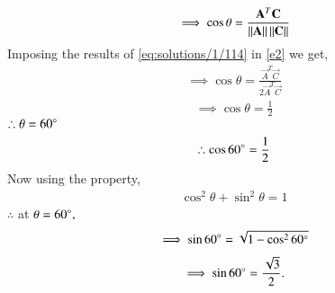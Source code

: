 \begin{align}
\implies \cos\theta = \frac{\mathbf{A}^T\mathbf{C}}{\left\lVert\mathbf{A}\right\rVert\left\lVert\mathbf{C}\right\rVert}
\label{e2}
\end{align}
Imposing the results of \eqref{eq:solutions/1/114} in \eqref{e2} we get,
\begin{align}
\implies \cos\theta = \frac{\vec{A}^T\vec{C}}{2\vec{A}^T\vec{C}}
\end{align}
\begin{align}
\implies \cos\theta = \frac{1}{2}
\end{align}
$\therefore \theta = 60\degree$
\begin{align}
\therefore \cos60\degree = \frac{1}{2}
\end{align}
Now using the property,
\begin{align}
\cos^2\theta +\sin^2\theta = 1
\end{align} 
$\therefore$ at $\theta = 60\degree, $
\begin{align}
\implies \sin60\degree = \sqrt{1-\cos^260\degree}
\end{align}
\begin{align}
\implies\sin60\degree = \frac{\sqrt{3}}{2}.
\end{align}
